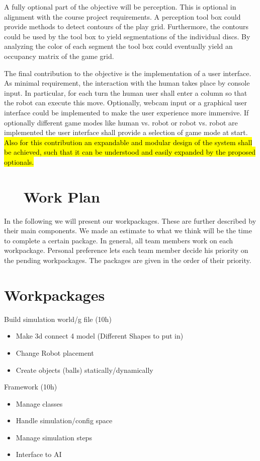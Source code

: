 \documentclass[11pt,pdftex,a4paper]{article}
\newcounter{exnum}
\newcommand{\ex}[1]{\section*{\theexnum $\quad$ #1 \stepcounter{exnum}}}
\begin{document}
	A fully optional part of the objective will be perception. 
	This is optional in alignment with the course project requirements. 
	A perception tool box could provide methods to detect contours of the play grid. 
	Furthermore, the contours could be used by the tool box to yield segmentations of the individual discs. 
	By analyzing the color of each segment the tool box could eventually yield an occupancy matrix of the game grid.
	
	The final contribution to the objective is the implementation of a user interface. 
	As minimal requirement, the interaction with the human takes place by console input. 
	In particular, for each turn the human user shall enter a column so that the robot can execute this move. 
	Optionally, webcam input or a graphical user interface could be implemented to make the user experience more immersive. 
	If optionally different game modes like human vs. robot or robot vs. robot are implemented the user interface shall provide a selection of game mode at start.
	\hl{Also for this contribution an expandable and modular design of the system shall be achieved, such that it can be understood and easily expanded by the proposed optionals.}
   
	\ex{Work Plan}
	In the following we will present our workpackages.
	These are further described by their main components.
	We made an estimate to what we think will be the time to complete a certain package.
	In general, all team members work on each workpackage.
	Personal preference lets each team member decide his priority on the pending workpackages.
	The packages are given in the order of their priority.
	
	\section*{Workpackages}
	\noindent
	Build simulation world/g file (10h)
	\begin{itemize}
	\item Make 3d connect 4 model (Different Shapes to put in)
	\item Change Robot placement
	\item Create objects (balls) statically/dynamically	
	\end{itemize}
	
	\noindent
	Framework (10h)
	\begin{itemize}
	\item Manage classes 
	\item Handle simulation/config space
	\item Manage simulation steps
	\item Interface to AI	
	\end{itemize}
	
\end{document}
